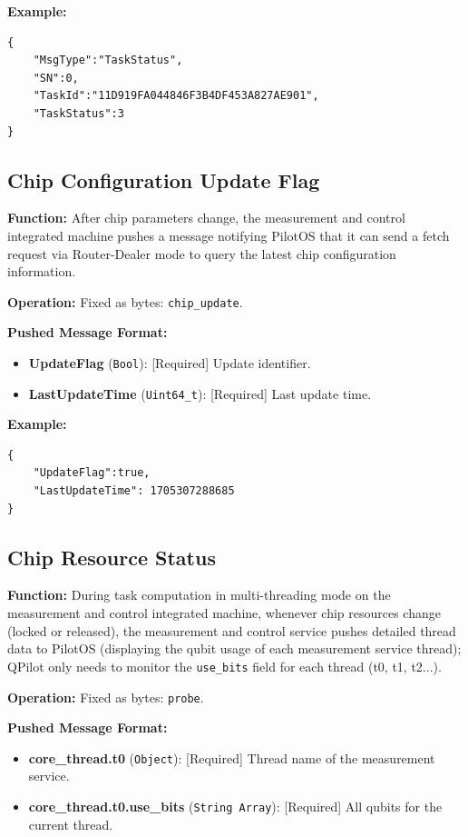 \documentclass[12pt, a4paper]{article}
\begin{document}
\noindent \textbf{Example:}
\begin{lstlisting}
{
    "MsgType":"TaskStatus",
    "SN":0,
   	"TaskId":"11D919FA044846F3B4DF453A827AE901",
    "TaskStatus":3
}
\end{lstlisting}

\subsection{Chip Configuration Update Flag}

\textbf{Function:} After chip parameters change, the measurement and control integrated machine pushes a message notifying PilotOS that it can send a fetch request via Router-Dealer mode to query the latest chip configuration information.

\textbf{Operation:} Fixed as bytes: \texttt{chip\_update}.

\textbf{Pushed Message Format:}
\begin{itemize}
    \item \textbf{UpdateFlag} (\texttt{Bool}): [Required] Update identifier.
    \item \textbf{LastUpdateTime} (\texttt{Uint64\_t}): [Required] Last update time.
\end{itemize}

\noindent \textbf{Example:}
\begin{lstlisting}
{
    "UpdateFlag":true,
    "LastUpdateTime": 1705307288685
}
\end{lstlisting}

\subsection{Chip Resource Status}

\textbf{Function:} During task computation in multi-threading mode on the measurement and control integrated machine, whenever chip resources change (locked or released), the measurement and control service pushes detailed thread data to PilotOS (displaying the qubit usage of each measurement service thread); QPilot only needs to monitor the \texttt{use\_bits} field for each thread (t0, t1, t2...).

\textbf{Operation:} Fixed as bytes: \texttt{probe}.

\textbf{Pushed Message Format:}
\begin{itemize}
    \item \textbf{core\_thread.t0} (\texttt{Object}): [Required] Thread name of the measurement service.
    \item \textbf{core\_thread.t0.use\_bits} (\texttt{String Array}): [Required] All qubits for the current thread.
\end{itemize}
\end{document}
